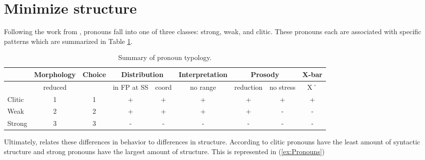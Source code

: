 \documentclass[12pt, letterpaper]{article}
\begin{document}
\section{Minimize structure} \label{sec:Minimize}

Following the work from \citet{cardinalettiTypologyStructuralDeficiency1999}, pronouns fall into one of three classes: strong, weak, and clitic. These pronouns each are associated with specific patterns which are summarized in Table \ref{tab:CSSummary}.

\begin{table}[!ht]
    \centering
    \caption{Summary of  pronoun typology.}
    \label{tab:CSSummary}
    \begin{tabular}{|l|c|c|c|c|c|c|c|c|}
    \hline
     & Morphology & Choice & \multicolumn{2}{|c|}{Distribution} & Interpretation & \multicolumn{2}{|c|}{Prosody} & X-bar  \\
    \hline 
    & reduced & & in FP at SS & coord & no range & reduction & no stress & X˚ \\
    \hline
    Clitic & 1 & 1 & + & + & + & + & + & + \\
    Weak & 2 & 2 & + & + & + & + & - & - \\
    Strong & 3 & 3 & - & - & - & - & - & - \\
    \hline
    \end{tabular}
\end{table}

Ultimately, \citet{cardinalettiTypologyStructuralDeficiency1999} relates these differences in behavior to differences in structure. According to \citeauthor{cardinalettiTypologyStructuralDeficiency1999} clitic pronouns have the least amount of syntactic structure and strong pronouns have the largest amount of structure. This is represented in (\ref{ex:Pronouns})
\end{document}
